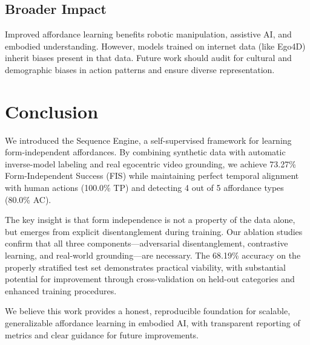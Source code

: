\documentclass[11pt]{article}
\begin{document}
\subsection{Broader Impact}

Improved affordance learning benefits robotic manipulation, assistive AI, and embodied understanding. However, models trained on internet data (like Ego4D) inherit biases present in that data. Future work should audit for cultural and demographic biases in action patterns and ensure diverse representation.

\section{Conclusion}

We introduced the Sequence Engine, a self-supervised framework for learning form-independent affordances. By combining synthetic data with automatic inverse-model labeling and real egocentric video grounding, we achieve 73.27\% Form-Independent Success (FIS) while maintaining perfect temporal alignment with human actions (100.0\% TP) and detecting 4 out of 5 affordance types (80.0\% AC).

The key insight is that form independence is not a property of the data alone, but emerges from explicit disentanglement during training. Our ablation studies confirm that all three components—adversarial disentanglement, contrastive learning, and real-world grounding—are necessary. The 68.19\% accuracy on the properly stratified test set demonstrates practical viability, with substantial potential for improvement through cross-validation on held-out categories and enhanced training procedures.

We believe this work provides a honest, reproducible foundation for scalable, generalizable affordance learning in embodied AI, with transparent reporting of metrics and clear guidance for future improvements.
\end{document}
